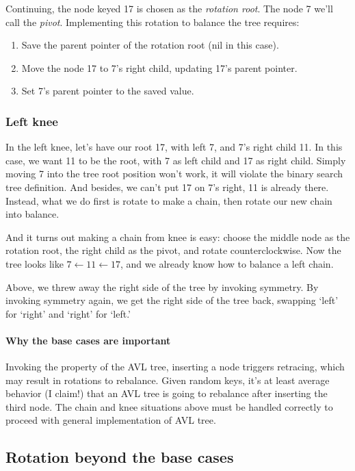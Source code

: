 \documentclass{article}
\begin{document}
Continuing, the node keyed 17 is chosen as the \textit{rotation root}.
The node 7 we'll call the \textit{pivot}. Implementing this rotation
to balance the tree requires:

\begin{enumerate}
  \item Save the parent pointer of the rotation root (nil in this case).
  \item Move the node 17 to 7's right child, updating 17's parent pointer.
  \item Set 7's parent pointer to the saved value.
\end{enumerate}

\subsubsection{Left knee}

In the left knee, let's have our root 17, with left 7, and 7's right
child 11. In this case, we want 11 to be the root, with 7 as left
child and 17 as right child. Simply moving 7 into the tree root
position won't work, it will violate the binary search tree definition.
And besides, we can't put 17 on 7's right, 11 is already there.
Instead, what we do first is rotate to make a chain, then rotate
our new chain into balance.

And it turns out making a chain from knee is easy: choose the middle
node as the rotation root, the right child as the pivot, and rotate
counterclockwise. Now the tree looks like $7 \leftarrow 11\leftarrow 17$, and we
already know how to balance a left chain.

Above, we threw away the right side of the tree by invoking symmetry.
By invoking symmetry again, we get the right side of the tree back,
swapping `left' for `right' and `right' for `left.'


\paragraph{Why the base cases are important}
Invoking the property of the AVL tree, inserting a node triggers retracing,
which may result in rotations to rebalance.  Given random keys, it's
at least average behavior (I claim!) that an AVL tree is going to rebalance after
inserting the third node. The chain and knee situations above must be handled
correctly to proceed with general implementation of AVL tree.


\subsection{Rotation beyond the base cases}
\end{document}
